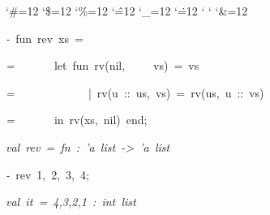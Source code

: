 \begin{list}{}
{\setlength{\leftmargin}{\leftmargini}
\setlength{\rightmargin}{0cm}
\setlength{\itemindent}{0cm}
\setlength{\listparindent}{0cm}
\setlength{\itemsep}{0cm}
\setlength{\parsep}{0cm}
\setlength{\labelsep}{0cm}
\setlength{\labelwidth}{0cm}
\catcode`\#=12
\catcode`\$=12
\catcode`\%=12
\catcode`\^=12
\catcode`\_=12
\catcode`\.=12
\catcode`
\catcode`
\catcode`\&=12
\ttfamily}
\small
\item[]\textsl{-\ }fun\ rev\ xs\ =
\item[]\textsl{=\ }\ \ \ \ \ \ let\ fun\ rv(nil,\ \ \ \ \ vs)\ =\ vs
\item[]\textsl{=\ }\ \ \ \ \ \ \ \ \ \ \ \ |\ rv(u\ ::\ us,\ vs)\ =\ rv(us,\ u\ ::\ vs)
\item[]\textsl{=\ }\ \ \ \ \ \ in\ rv(xs,\ nil)\ end;
\item[]\textsl{val\ rev\ =\ fn\ :\ 'a\ list\ ->\ 'a\ list}
\item[]\textsl{-\ }rev\ 1,\ 2,\ 3,\ 4;
\item[]\textsl{val\ it\ =\ 4,3,2,1\ :\ int\ list}
\end{list}
